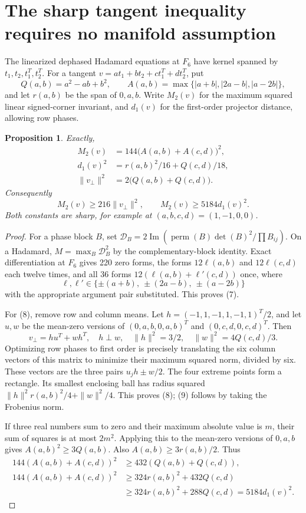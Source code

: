 \documentclass[11pt]{article}
\newtheorem{proposition}[theorem]{Proposition}
\newcommand{\perm}{\operatorname{perm}}
\begin{document}
\section{The sharp tangent inequality requires no manifold assumption}
The linearized dephased Hadamard equations at $F_6$ have kernel
spanned by $t_1,t_2,t_1^T,t_2^T$. For a tangent
$v=a t_1+b t_2+c t_1^T+d t_2^T$, put
\[
 Q(a,b)=a^2-ab+b^2,\qquad
 A(a,b)=\max\{|a+b|,|2a-b|,|a-2b|\},
\]
and let $r(a,b)$ be the span of $0,a,b$.
Write $M_2(v)$ for the maximum squared linear signed-corner invariant,
and $d_1(v)$ for the first-order projector distance, allowing row phases.

\begin{proposition}
Exactly,
\begin{align}
 M_2(v)&=144\bigl(A(a,b)+A(c,d)\bigr)^2,\tag{7}\\
 d_1(v)^2&=r(a,b)^2/16+Q(c,d)/18,\tag{8}\\
 \|v_\perp\|^2&=2\bigl(Q(a,b)+Q(c,d)\bigr).\tag{9}
\end{align}
Consequently
\[
 M_2(v)\ge216\|v_\perp\|^2,\qquad
 M_2(v)\ge5184d_1(v)^2.\tag{10}
\]
Both constants are sharp, for example at $(a,b,c,d)=(1,-1,0,0)$.
\end{proposition}

\begin{proof}
For a phase block $B$, set
$\mathcal D_B=2\operatorname{Im}(\perm(B)\det(B)^2/\prod B_{ij})$.
On a Hadamard, $M=\max_B\mathcal D_B^2$ by the complementary-block
identity. Exact differentiation at $F_6$ gives 220 zero forms,
the forms $12\ell(a,b)$ and $12\ell(c,d)$ each twelve times, and
all 36 forms $12(\ell(a,b)+\ell'(c,d))$ once, where
\[
 \ell,\ell'\in\{\pm(a+b),\ \pm(2a-b),\ \pm(a-2b)\}
\]
with the appropriate argument pair substituted. This proves (7).

For (8), remove row and column means. Let
$h=(-1,1,-1,1,-1,1)^T/2$, and let $u,w$ be the mean-zero versions
of $(0,a,b,0,a,b)^T$ and $(0,c,d,0,c,d)^T$. Then
\[
 v_\perp=hu^T+wh^T,\quad h\perp w,\quad
 \|h\|^2=3/2,\quad \|w\|^2=4Q(c,d)/3.
\]
Optimizing row phases to first order is precisely translating the six
column vectors of this matrix to minimize their maximum squared norm,
divided by six. These vectors are the three pairs $u_jh\pm w/2$.
The four extreme points form a rectangle. Its smallest enclosing ball
has radius squared $\|h\|^2r(a,b)^2/4+\|w\|^2/4$.
This proves (8); (9) follows by taking the Frobenius norm.

If three real numbers sum to zero and their maximum absolute value is
$m$, their sum of squares is at most $2m^2$.
Applying this to the mean-zero versions of $0,a,b$ gives
$A(a,b)^2\ge3Q(a,b)$. Also $A(a,b)\ge3r(a,b)/2$.
Thus
\begin{align*}
 144(A(a,b)+A(c,d))^2
 &\ge432(Q(a,b)+Q(c,d)),\\
 144(A(a,b)+A(c,d))^2
 &\ge324r(a,b)^2+432Q(c,d)\\
 &\ge324r(a,b)^2+288Q(c,d)=5184d_1(v)^2.
\end{align*}
\end{proof}
\end{document}
